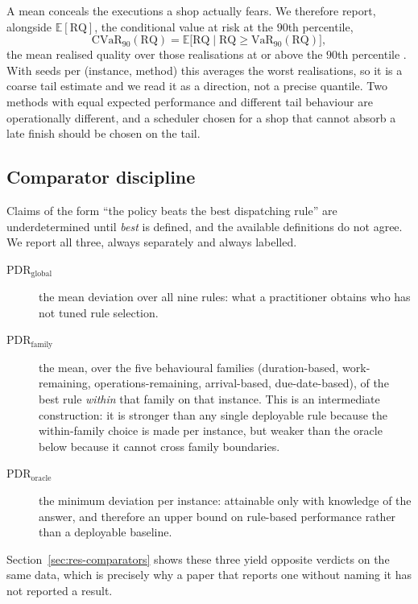\documentclass[a4paper,fleqn]{cas-sc}
\newcommand{\RQ}{\mathrm{RQ}}
\newcommand{\CVaR}{\mathrm{CVaR}}
\begin{document}
A mean conceals the executions a shop actually fears. We therefore report,
alongside $\mathbb{E}[\RQ]$, the conditional value at risk at the $90$th
percentile,
\begin{equation}
  \CVaR_{90}(\RQ)=\mathbb{E}\big[\RQ \mid \RQ \ge \mathrm{VaR}_{90}(\RQ)\big],
\end{equation}
the mean realised quality over those realisations at or above the $90$th
percentile \citep{rockafellar2000,jorion2007}. With \SeedsPerCell{} seeds per
(instance, method) this averages the worst \CVaRTail{} realisations, so it is a
coarse tail estimate and we read it as a direction, not a precise quantile. Two methods with equal expected performance
and different tail behaviour are operationally different, and a scheduler chosen
for a shop that cannot absorb a late finish should be chosen on the tail.

\subsection{Comparator discipline}\label{sec:comparators}

Claims of the form ``the policy beats the best dispatching rule'' are
underdetermined until \emph{best} is defined, and the available definitions do
not agree. We report all three, always separately and always labelled.

\begin{description}
\item[$\mathrm{PDR}_{\mathrm{global}}$] the mean deviation over all nine rules:
what a practitioner obtains who has not tuned rule selection.
\item[$\mathrm{PDR}_{\mathrm{family}}$] the mean, over the five behavioural
families (duration-based, work-remaining, operations-remaining, arrival-based,
due-date-based), of the best rule \emph{within} that family on that instance.
This is an intermediate construction: it is stronger than any single deployable
rule because the within-family choice is made per instance, but weaker than the
oracle below because it cannot cross family boundaries.
\item[$\mathrm{PDR}_{\mathrm{oracle}}$] the minimum deviation per instance:
attainable only with knowledge of the answer, and therefore an upper bound on
rule-based performance rather than a deployable baseline.
\end{description}

Section~\ref{sec:res-comparators} shows these three yield opposite verdicts on
the same data, which is precisely why a paper that reports one without naming it
has not reported a result.
\end{document}
